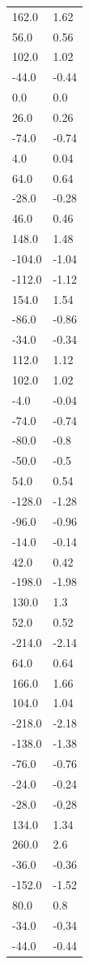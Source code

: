 \begin{longtable}{ll}
162.0 & 1.62 \\
56.0 & 0.56 \\
102.0 & 1.02 \\
-44.0 & -0.44 \\
0.0 & 0.0 \\
26.0 & 0.26 \\
-74.0 & -0.74 \\
4.0 & 0.04 \\
64.0 & 0.64 \\
-28.0 & -0.28 \\
46.0 & 0.46 \\
148.0 & 1.48 \\
-104.0 & -1.04 \\
-112.0 & -1.12 \\
154.0 & 1.54 \\
-86.0 & -0.86 \\
-34.0 & -0.34 \\
112.0 & 1.12 \\
102.0 & 1.02 \\
-4.0 & -0.04 \\
-74.0 & -0.74 \\
-80.0 & -0.8 \\
-50.0 & -0.5 \\
54.0 & 0.54 \\
-128.0 & -1.28 \\
-96.0 & -0.96 \\
-14.0 & -0.14 \\
42.0 & 0.42 \\
-198.0 & -1.98 \\
130.0 & 1.3 \\
52.0 & 0.52 \\
-214.0 & -2.14 \\
64.0 & 0.64 \\
166.0 & 1.66 \\
104.0 & 1.04 \\
-218.0 & -2.18 \\
-138.0 & -1.38 \\
-76.0 & -0.76 \\
-24.0 & -0.24 \\
-28.0 & -0.28 \\
134.0 & 1.34 \\
260.0 & 2.6 \\
-36.0 & -0.36 \\
-152.0 & -1.52 \\
80.0 & 0.8 \\
-34.0 & -0.34 \\
-44.0 & -0.44 \\

\end{longtable}

